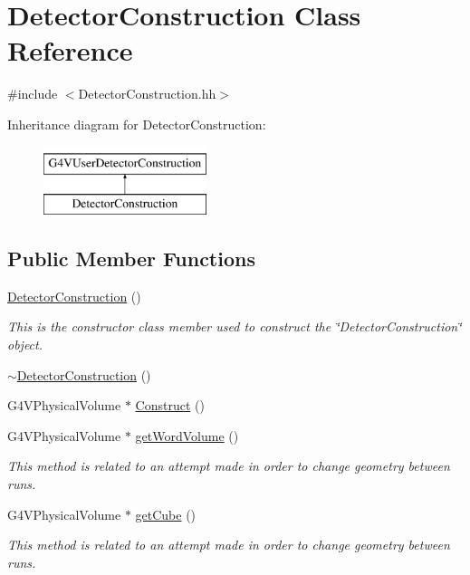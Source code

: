 \hypertarget{class_detector_construction}{\section{Detector\-Construction Class Reference}
\label{class_detector_construction}
}


{\ttfamily \#include $<$Detector\-Construction.\-hh$>$}

Inheritance diagram for Detector\-Construction\-:\begin{figure}[H]
\begin{center}
\leavevmode
\includegraphics[height=2.000000cm]{class_detector_construction}
\end{center}
\end{figure}
\subsection*{Public Member Functions}
\begin{DoxyCompactItemize}
\item 
\hyperlink{class_detector_construction_a1533c4308baddd0b2dcdf40f61dea1ef}{Detector\-Construction} ()
\begin{DoxyCompactList}\small\item\em This is the constructor class member used to construct the \char`\"{}\-Detector\-Construction\char`\"{} object. \end{DoxyCompactList}\item 
\hyperlink{class_detector_construction_a73013cab35a2b470338da2e4686edea3}{$\sim$\-Detector\-Construction} ()
\item 
G4\-V\-Physical\-Volume $\ast$ \hyperlink{class_detector_construction_a662c618480b345a747f014b845d5ffdf}{Construct} ()
\item 
G4\-V\-Physical\-Volume $\ast$ \hyperlink{class_detector_construction_ab3d0fbcccb1be35f505a78e7fd4ffce2}{get\-Word\-Volume} ()
\begin{DoxyCompactList}\small\item\em This method is related to an attempt made in order to change geometry between runs. \end{DoxyCompactList}\item 
G4\-V\-Physical\-Volume $\ast$ \hyperlink{class_detector_construction_af45ab5e73219e233c7c015573cf4f88f}{get\-Cube} ()
\begin{DoxyCompactList}\small\item\em This method is related to an attempt made in order to change geometry between runs. \end{DoxyCompactList}\end{DoxyCompactItemize}


